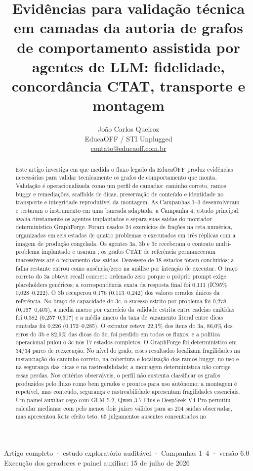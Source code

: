 \documentclass[11pt,a4paper]{article}
\title{\bfseries Evidências para validação técnica em camadas da autoria de grafos de comportamento assistida por agentes de LLM: fidelidade, concordância CTAT, transporte e montagem}
\author{João Carlos Queiroz\\\small EducaOFF / STI Unplugged\\\small \href{mailto:contato@educaoff.com.br}{contato@educaoff.com.br}}
\date{}
\begin{document}
\maketitle
\vspace{-1.8em}
\begin{center}
\small Artigo completo · estudo exploratório auditável · Campanhas 1--4 · versão 6.0\\
\footnotesize Execução dos geradores e painel auxiliar: 15 de julho de 2026
\end{center}
\vspace{0.5em}

\begin{abstract}
Este artigo investiga em que medida o fluxo legado da EducaOFF produz evidências necessárias para validar tecnicamente os grafos de comportamento que monta. Validação é operacionalizada como um perfil de camadas: caminho correto, ramos buggy e remediações, scaffolds de dicas, preservação de conteúdo e identidade no transporte e integridade reprodutível da montagem. As Campanhas 1--3 desenvolveram e testaram o instrumento em uma bancada adaptada; a Campanha 4, estudo principal, avalia diretamente os agentes implantados e separa suas saídas do montador determinístico GraphForge. Foram usados 24 exercícios de frações na reta numérica, organizados em seis estados de quatro problemas e executados em três réplicas com a imagem de produção congelada. Os agentes 3a, 3b e 3c receberam o contrato multi-problema implantado e usaram ; os grafos CTAT de referência permaneceram inacessíveis até o fechamento das saídas. Dezessete de 18 estados foram concluídos; a falha restante entrou como ausência/zero na análise por intenção de executar. O traço correto do 3a obteve recall concreto ordenado zero porque o próprio prompt exige placeholders genéricos; a correspondência exata da resposta final foi 0,111 (IC95\% 0,028--0,222). O 3b recuperou 0,176 (0,113--0,242) dos valores errados únicos da referência. No braço de capacidade do 3c, o sucesso estrito por problema foi 0,278 (0,167--0,403), a média macro por exercício da validade estrita entre cadeias emitidas foi 0,382 (0,257--0,507) e a média macro da taxa de vazamento literal entre dicas emitidas foi 0,226 (0,172--0,285). O extrator reteve 22,1\% dos itens do 3a, 86,0\% dos erros do 3b e 82,9\% das dicas do 3c;  foi perdido em todos os fluxos, e a política operacional pulou o 3c nos 17 estados completos. O GraphForge foi determinístico em 34/34 pares de reexecução. No nível do grafo, esses resultados localizam fragilidades na instanciação do caminho correto, na cobertura e localização dos ramos buggy, no uso e na segurança das dicas e na rastreabilidade; a montagem determinística não corrige essas perdas. Nos critérios observáveis, o perfil não sustenta classificar os grafos produzidos pelo fluxo como bem gerados e prontos para uso autônomo: a montagem é repetível, mas conteúdo, segurança e rastreabilidade apresentam fragilidades essenciais. Um painel auxiliar cego com GLM-5.2, Qwen 3.7 Plus e DeepSeek V4 Pro permitiu calcular medianas com pelo menos dois juízes válidos para as 204 saídas observadas, mas apresentou forte efeito teto, 65 julgamentos ausentes concentrados no 
\end{abstract}
\end{document}
